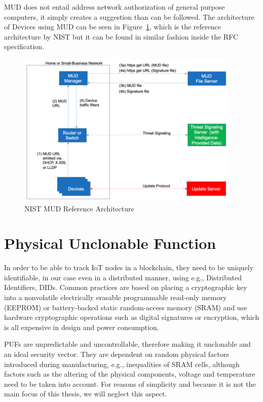 MUD does not entail address network authorization of general purpose computers, it simply creates a suggestion than can
be followed.
The architecture of Devices using MUD can be seen in Figure~\ref{fig:NIST MUD Reference Architecture}, which is the
reference architecture by NIST \cite{dodson2021securing} but it can be found in similar fashion inside the RFC
specification.

\begin{figure}
	\begin{center}
		\includegraphics[width=0.95\textwidth]{figures/nist-mud-arch.png}
	\end{center}
	\caption{NIST MUD Reference Architecture}
	\label{fig:NIST MUD Reference Architecture}
\end{figure}

\section{Physical Unclonable Function} %
\label{sec:Physical Unclonable Function}

In order to be able to track IoT nodes in a blockchain, they need to be uniquely identifiable, in our case even in a
distributed manner, using e.g., Distributed Identifiers, DIDs.
Common practices are based on placing a cryptographic key into a nonvolatile electrically erasable programmable
read-only memory (EEPROM) or battery-backed static random-access memory (SRAM) and use hardware cryptographic operations
such as digital signatures or encryption, which is all expensive in design and power consumption. \cite{herder2014physical}

PUFs are unpredictable and uncontrollable, therefore making it unclonable and an ideal security vector. They are
dependent on random physical factors introduced during manufacturing, e.g., inequalities of SRAM cells, although factors
such as the altering of the physical components, voltage and temperature need to be taken into account. \cite{vinagrero2023sram}
For reasons of simplicity and because it is not the main focus of this thesis, we will neglect this aspect.

